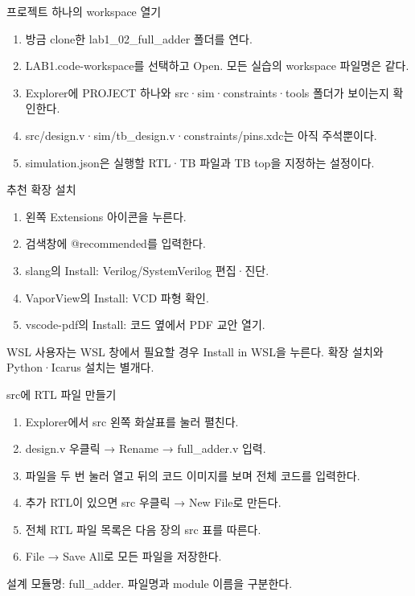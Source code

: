 \begin{frame}{프로젝트 하나의 workspace 열기}\relax
\small
\begin{enumerate}\setlength{\itemsep}{0.22cm}
\item 방금 clone한 lab1\_02\_full\_adder 폴더를 연다.
\item LAB1.code-workspace를 선택하고 Open. 모든 실습의 workspace 파일명은 같다.
\item Explorer에 PROJECT 하나와 src·sim·constraints·tools 폴더가 보이는지 확인한다.
\item src/design.v·sim/tb\_design.v·constraints/pins.xdc는 아직 주석뿐이다.
\item simulation.json은 실행할 RTL·TB 파일과 TB top을 지정하는 설정이다.
\end{enumerate}

\end{frame}

\begin{frame}{추천 확장 설치}\relax
\small
\begin{enumerate}\setlength{\itemsep}{0.22cm}
\item 왼쪽 Extensions 아이콘을 누른다.
\item 검색창에 @recommended를 입력한다.
\item slang의 Install: Verilog/SystemVerilog 편집·진단.
\item VaporView의 Install: VCD 파형 확인.
\item vscode-pdf의 Install: 코드 옆에서 PDF 교안 열기.
\end{enumerate}
WSL 사용자는 WSL 창에서 필요할 경우 Install in WSL을 누른다. 확장 설치와 Python·Icarus 설치는 별개다.\par
\end{frame}

\begin{frame}{src에 RTL 파일 만들기}\relax
\small
\begin{enumerate}\setlength{\itemsep}{0.22cm}
\item Explorer에서 src 왼쪽 화살표를 눌러 펼친다.
\item design.v 우클릭 → Rename → full\_adder.v 입력.
\item 파일을 두 번 눌러 열고 뒤의 코드 이미지를 보며 전체 코드를 입력한다.
\item 추가 RTL이 있으면 src 우클릭 → New File로 만든다.
\item 전체 RTL 파일 목록은 다음 장의 src 표를 따른다.
\item File → Save All로 모든 파일을 저장한다.
\end{enumerate}
설계 모듈명: full\_adder. 파일명과 module 이름을 구분한다.\par
\end{frame}

